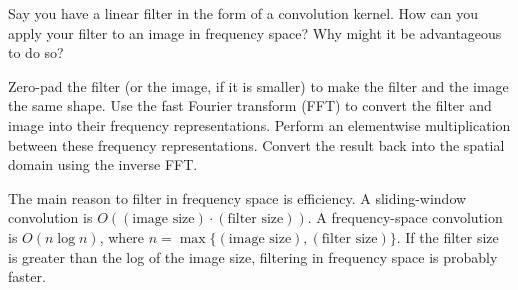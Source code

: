 \begin{blocksection}
\question Say you have a linear filter in the form of a convolution kernel. How can you apply your filter to an image in frequency space? Why might it be advantageous to do so?

\begin{solution}[0.75in]
Zero-pad the filter (or the image, if it is smaller) to make the filter and the image the same shape. Use the fast Fourier transform (FFT) to convert the filter and image into their frequency representations. Perform an elementwise multiplication between these frequency representations. Convert the result back into the spatial domain using the inverse FFT.

The main reason to filter in frequency space is efficiency. A sliding-window convolution is $O((\text{image size}) \cdot (\text{filter size}))$. A frequency-space convolution is $O(n\log n)$, where $n = \max{\{(\text{image size}), (\text{filter size})\}}$. If the filter size is greater than the log of the image size, filtering in frequency space is probably faster.
\end{solution}
\end{blocksection}
